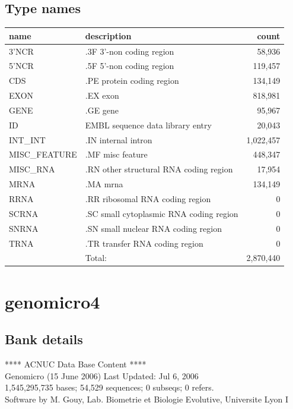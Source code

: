 \documentclass{article}
\begin{document}
\begin{Schunk}
\subsection{Type names}
\noindent\begin{tabular}{llr}
\hline \hline
name & description & count \\
\hline
3'NCR  &  .3F  3'-non coding region  &  58,936 \\
5'NCR  &  .5F  5'-non coding region  &  119,457 \\
CDS  &  .PE protein coding region  &  134,149 \\
EXON  &  .EX exon  &  818,981 \\
GENE  &  .GE gene  &  95,967 \\
ID  &  EMBL sequence data library entry  &  20,043 \\
INT\_INT  &  .IN  internal intron  &  1,022,457 \\
MISC\_FEATURE  &  .MF misc feature  &  448,347 \\
MISC\_RNA  &  .RN other structural RNA coding region  &  17,954 \\
MRNA  &  .MA mrna  &  134,149 \\
RRNA  &  .RR ribosomal RNA coding region  &  0 \\
SCRNA  &  .SC small cytoplasmic RNA coding region  &  0 \\
SNRNA  &  .SN small nuclear RNA coding region  &  0 \\
TRNA  &  .TR transfer RNA coding region  &  0 \\
\hline
 & Total: & 2,870,440 \\
\hline \hline
\end{tabular}

\section{ genomicro4 }
\subsection{Bank details}
             ****     ACNUC Data Base Content      ****                         \\
              Genomicro (15 June 2006) Last Updated: Jul  6, 2006\\
1,545,295,735 bases; 54,529 sequences; 0 subseqs; 0 refers.\\
Software by M. Gouy, Lab. Biometrie et Biologie Evolutive, Universite Lyon I 


\end{Schunk}
\end{document}
